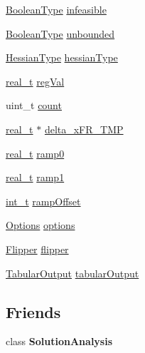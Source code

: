 \begin{DoxyCompactItemize}
\item 
\hyperlink{_types_8hpp_a20f82124c82b6f5686a7fce454ef9089}{Boolean\+Type} \hyperlink{class_q_problem_b_acfeba7662b0bc3050ae37b857e3ea419}{infeasible}
\item 
\hyperlink{_types_8hpp_a20f82124c82b6f5686a7fce454ef9089}{Boolean\+Type} \hyperlink{class_q_problem_b_a689fdbbb9231d84e6c653da59d069963}{unbounded}
\item 
\hyperlink{_types_8hpp_a604cad5cda14e378ce4a77ab28ee9fd9}{Hessian\+Type} \hyperlink{class_q_problem_b_af288e4e7320b9c47c2c95a230cedcbf4}{hessian\+Type}
\item 
\hyperlink{qp_o_a_s_e_s__wrapper_8h_a0d00e2b3dfadee81331bbb39068570c4}{real\+\_\+t} \hyperlink{class_q_problem_b_af908e16b53b18ca061a7c1c894c17e8b}{reg\+Val}
\item 
uint\+\_\+t \hyperlink{class_q_problem_b_a4d259bca2027133955de304eac49054b}{count}
\item 
\hyperlink{qp_o_a_s_e_s__wrapper_8h_a0d00e2b3dfadee81331bbb39068570c4}{real\+\_\+t} $\ast$ \hyperlink{class_q_problem_b_a06e401f5f0d6f9a9ce2caa81dc5d85b6}{delta\+\_\+x\+F\+R\+\_\+\+T\+MP}
\item 
\hyperlink{qp_o_a_s_e_s__wrapper_8h_a0d00e2b3dfadee81331bbb39068570c4}{real\+\_\+t} \hyperlink{class_q_problem_b_ac26a4dc4501ff1d6249631ea24e98d4c}{ramp0}
\item 
\hyperlink{qp_o_a_s_e_s__wrapper_8h_a0d00e2b3dfadee81331bbb39068570c4}{real\+\_\+t} \hyperlink{class_q_problem_b_ac3741a9c8073cbb90b2fa071f10930b6}{ramp1}
\item 
\hyperlink{_types_8hpp_ab6fd6105e64ed14a0c9281326f05e623}{int\+\_\+t} \hyperlink{class_q_problem_b_a28453afb30a33fe30b59c592586d49c2}{ramp\+Offset}
\item 
\hyperlink{class_options}{Options} \hyperlink{class_q_problem_b_a59d8ee93443bc8e7ce509a94ff4330e6}{options}
\item 
\hyperlink{class_flipper}{Flipper} \hyperlink{class_q_problem_b_afc23c08b6cdc0ca93f9c049e9a318744}{flipper}
\item 
\hyperlink{struct_tabular_output}{Tabular\+Output} \hyperlink{class_q_problem_b_a81466d68cbeae767710b1d804a9b65cd}{tabular\+Output}
\end{DoxyCompactItemize}
\subsection*{Friends}
\begin{DoxyCompactItemize}
\item 
\mbox{\label{class_q_problem_b_ab55a166adacbc90da27a86b0010c81d7}} 
class {\bfseries Solution\+Analysis}
\end{DoxyCompactItemize}


